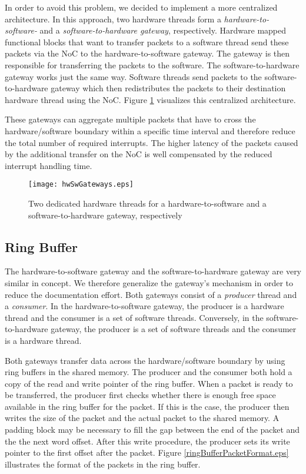 In order to avoid this problem, we decided to implement a more centralized architecture. In this approach, two hardware threads form a \textit{hardware-to-software-} and a \textit{software-to-hardware gateway}, respectively. Hardware mapped functional blocks that want to transfer packets to a software thread send these packets via the NoC to the hardware-to-software gateway. The gateway is then responsible for transferring the packets to the software. The software-to-hardware gateway works just the same way. Software threads send packets to the software-to-hardware gateway which then redistributes the packets to their destination hardware thread using the NoC. Figure \ref{hwSwGateways.eps} visualizes this centralized architecture.

These gateways can aggregate multiple packets that have to cross the hardware/software boundary within a specific time interval and therefore reduce the total number of required interrupts. The higher latency of the packets caused by the additional transfer on the NoC is well compensated by the reduced interrupt handling time.

\begin{figure}
  \begin{center}
		 \texttt{[image: hwSwGateways.eps]}
  \caption{Two dedicated hardware threads for a hardware-to-software and a software-to-hardware gateway, respectively}
  \label{hwSwGateways.eps}
  \end{center}
\end{figure}

\subsection{Ring Buffer}
The hardware-to-software gateway and the software-to-hardware gateway are very similar in concept. We therefore generalize the gateway's mechanism in order to reduce the documentation effort. Both gateways consist of a \textit{producer} thread and a \textit{consumer}. In the hardware-to-software gateway, the producer is a hardware thread and the consumer is a set of software threads. Conversely, in the software-to-hardware gateway, the producer is a set of software threads and the consumer is a hardware thread.

Both gateways transfer data across the hardware/software boundary by using ring buffers in the shared memory. The producer and the consumer both hold a copy of the read and write pointer of the ring buffer. When a packet is ready to be transferred, the producer first checks whether there is enough free space available in the ring buffer for the packet. If this is the case, the producer then writes the size of the packet and the actual packet to the shared memory. A padding block may be necessary to fill the gap between the end of the packet and the the next word offset. After this write procedure, the producer sets its write pointer to the first offset after the packet. Figure \ref{ringBufferPacketFormat.eps} illustrates the format of the packets in the ring buffer.

